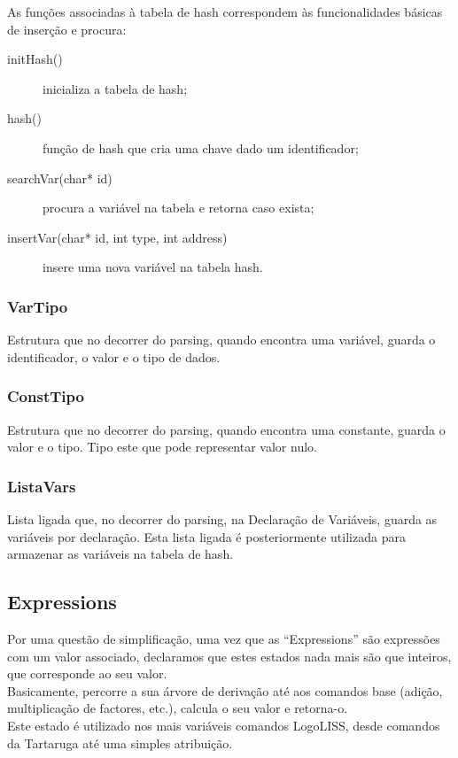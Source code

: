 \documentclass[12pt,a4paper,oneside]{article}
\newenvironment{codefold}{}{}
\begin{document}
\begin{codefold}
\indent As funções associadas à tabela de hash correspondem às funcionalidades básicas de inserção e procura:

\begin{description}
 \item [initHash()] inicializa a tabela de hash;
 \item [hash()] função de hash que cria uma chave dado um identificador;
 \item [searchVar(char* id)] procura a variável na tabela e retorna caso exista;
 \item [insertVar(char* id, int type, int address)] insere uma nova variável na tabela hash.
\end{description}


    \subsubsection{VarTipo}

\indent Estrutura que no decorrer do parsing, quando encontra uma variável, guarda o identificador, o valor e o tipo de dados.\\

    \subsubsection{ConstTipo}

\indent Estrutura que no decorrer do parsing, quando encontra uma constante, guarda o valor e o tipo. Tipo este que pode representar valor nulo.\\

    \subsubsection{ListaVars}

\indent Lista ligada que, no decorrer do parsing, na Declaração de Variáveis, guarda as variáveis por declaração. Esta lista ligada é posteriormente utilizada para
armazenar as variáveis na tabela de hash.\\

  \subsection{Expressions}

\indent Por uma questão de simplificação, uma vez que as ``Expressions'' são expressões com um valor associado, declaramos que estes estados nada mais são que inteiros,
que corresponde ao seu valor.\\
\indent Basicamente, percorre a sua árvore de derivação até aos comandos base (adição, multiplicação de factores, etc.), calcula o seu valor e retorna-o.\\
\indent Este estado é utilizado nos mais variáveis comandos LogoLISS, desde comandos da Tartaruga até uma simples atribuição.\\


\end{codefold}
\end{document}
